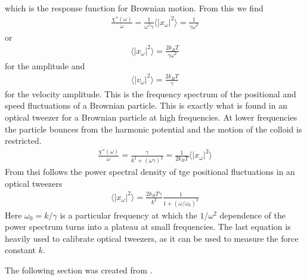 \documentclass[letterpaper,10pt,english]{sphinxmanual}
\begin{document}
\sphinxAtStartPar
which is the response function for Brownian motion. From this we find
\begin{equation*}
\begin{split}\frac{\chi''(\omega)}{\omega}=\frac{1}{\omega^2 \gamma}\langle |x_{\omega}|^2\rangle=\frac{1}{\gamma \omega^2}\end{split}
\end{equation*}
\sphinxAtStartPar
or
\begin{equation*}
\begin{split}\langle |x_{\omega}|^2\rangle=\frac{2k_B T}{\gamma \omega^2}\end{split}
\end{equation*}
\sphinxAtStartPar
for the amplitude and
\begin{equation*}
\begin{split}\langle |v_{\omega}|^2\rangle=\frac{2k_B T}{\gamma}\end{split}
\end{equation*}
\sphinxAtStartPar
for the velocity amplitude. This is the frequency spectrum of the positional and speed fluctuations of a Brownian particle. This is exactly what is found in an optical tweezer for a Brownian particle at high frequencies. At lower frequencies the particle bounces from the harmonic potential and the motion of the colloid is restricted.
\begin{equation*}
\begin{split}\frac{\chi''(\omega)}{\omega}=\frac{\gamma}{k^2+(\omega \gamma)^2}=\frac{1}{2k_B T}\langle |x_{\omega}|^2\rangle\end{split}
\end{equation*}
\sphinxAtStartPar
From thsi follows the power spectral density of tge positional fluctuations in an optical tweezers
\begin{equation*}
\begin{split}\langle |x_{\omega}|^2\rangle =\frac{2k_B T \gamma}{k^2}\frac{1}{1+(\omega/\omega_0)^2}\end{split}
\end{equation*}
\sphinxAtStartPar
Here \(\omega_0=k/\gamma\) is a particular frequency at which the \(1/\omega^2\) dependence of the power spectrum turns into a plateau at small frequencies. The last equation is heavily used to calibrate optical tweezers, as it can be used to measure the force constant \(k\).

\noindent{}



\sphinxAtStartPar
The following section was created from .
\end{document}
